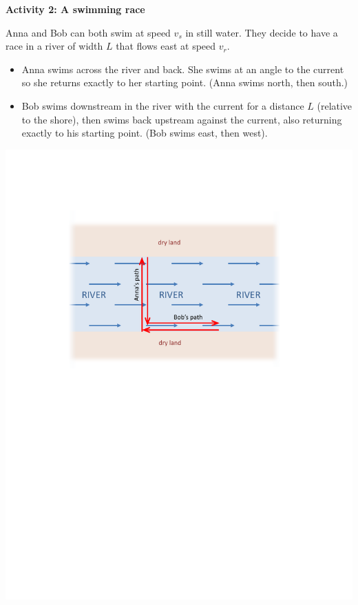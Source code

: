 \textbf{Activity 2: A swimming race} 

Anna and Bob can both swim at speed $v_s$ in still water.  They decide to have a race in a river of width $L$ that flows east at speed $v_r$.

\begin{minipage}{0.50 \textwidth}
\smallskip
\begin{itemize}
\item Anna swims across the river and back.  She swims at an angle to the current so she returns   exactly to her starting point.  (Anna swims north, then south.)
\item Bob swims downstream in the river with the current for a distance $L$ (relative to the shore), then swims back upstream against the current, also returning exactly to his starting point. (Bob swims east, then west).
\end{itemize}
\smallskip
\end{minipage}
\begin{minipage}{0.49 \textwidth}

\hspace{\fill}\includegraphics[scale=0.55]{swimming_race/river_diagram.pdf}
\end{minipage}

